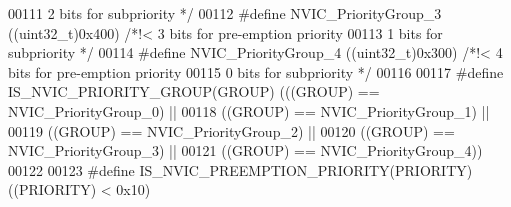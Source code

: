 \begin{DoxyCode}
00111 \textcolor{comment}{                                                            2 bits for subpriority */}
00112 \textcolor{preprocessor}{#}\textcolor{preprocessor}{define} \textcolor{preprocessor}{NVIC\_PriorityGroup\_3}         \textcolor{preprocessor}{(}\textcolor{preprocessor}{(}\textcolor{preprocessor}{uint32\_t}\textcolor{preprocessor}{)}0x400\textcolor{preprocessor}{)} \textcolor{comment}{/*!< 3 bits for pre-emption priority}
00113 \textcolor{comment}{                                                            1 bits for subpriority */}
00114 \textcolor{preprocessor}{#}\textcolor{preprocessor}{define} \textcolor{preprocessor}{NVIC\_PriorityGroup\_4}         \textcolor{preprocessor}{(}\textcolor{preprocessor}{(}\textcolor{preprocessor}{uint32\_t}\textcolor{preprocessor}{)}0x300\textcolor{preprocessor}{)} \textcolor{comment}{/*!< 4 bits for pre-emption priority}
00115 \textcolor{comment}{                                                            0 bits for subpriority */}
00116 
00117 \textcolor{preprocessor}{#}\textcolor{preprocessor}{define} \textcolor{preprocessor}{IS\_NVIC\_PRIORITY\_GROUP}\textcolor{preprocessor}{(}\textcolor{preprocessor}{GROUP}\textcolor{preprocessor}{)} \textcolor{preprocessor}{(}\textcolor{preprocessor}{(}\textcolor{preprocessor}{(}\textcolor{preprocessor}{GROUP}\textcolor{preprocessor}{)} \textcolor{preprocessor}{==} NVIC_PriorityGroup_0\textcolor{preprocessor}{)} \textcolor{preprocessor}{||}
00118                                        \textcolor{preprocessor}{(}\textcolor{preprocessor}{(}\textcolor{preprocessor}{GROUP}\textcolor{preprocessor}{)} \textcolor{preprocessor}{==} NVIC_PriorityGroup_1\textcolor{preprocessor}{)} \textcolor{preprocessor}{||}
00119                                        \textcolor{preprocessor}{(}\textcolor{preprocessor}{(}\textcolor{preprocessor}{GROUP}\textcolor{preprocessor}{)} \textcolor{preprocessor}{==} NVIC_PriorityGroup_2\textcolor{preprocessor}{)} \textcolor{preprocessor}{||}
00120                                        \textcolor{preprocessor}{(}\textcolor{preprocessor}{(}\textcolor{preprocessor}{GROUP}\textcolor{preprocessor}{)} \textcolor{preprocessor}{==} NVIC_PriorityGroup_3\textcolor{preprocessor}{)} \textcolor{preprocessor}{||}
00121                                        \textcolor{preprocessor}{(}\textcolor{preprocessor}{(}\textcolor{preprocessor}{GROUP}\textcolor{preprocessor}{)} \textcolor{preprocessor}{==} NVIC_PriorityGroup_4\textcolor{preprocessor}{)}\textcolor{preprocessor}{)}
00122 
00123 \textcolor{preprocessor}{#}\textcolor{preprocessor}{define} \textcolor{preprocessor}{IS\_NVIC\_PREEMPTION\_PRIORITY}\textcolor{preprocessor}{(}\textcolor{preprocessor}{PRIORITY}\textcolor{preprocessor}{)}  \textcolor{preprocessor}{(}\textcolor{preprocessor}{(}\textcolor{preprocessor}{PRIORITY}\textcolor{preprocessor}{)} \textcolor{preprocessor}{<} 0x10\textcolor{preprocessor}{)}

\end{DoxyCode}
